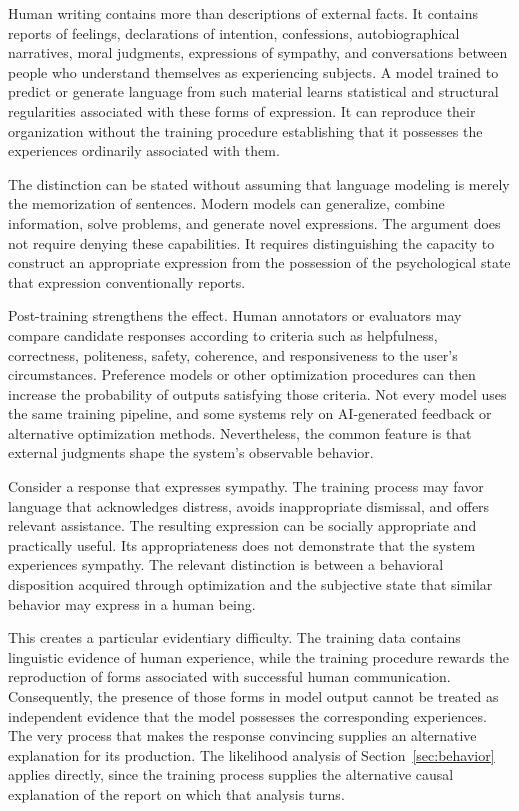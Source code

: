\documentclass[12pt]{article}
\theoremstyle{definition}
\begin{document}
Human writing contains more than descriptions of external facts. It contains reports of feelings, declarations of intention, confessions, autobiographical narratives, moral judgments, expressions of sympathy, and conversations between people who understand themselves as experiencing subjects. A model trained to predict or generate language from such material learns statistical and structural regularities associated with these forms of expression. It can reproduce their organization without the training procedure establishing that it possesses the experiences ordinarily associated with them.

The distinction can be stated without assuming that language modeling is merely the memorization of sentences. Modern models can generalize, combine information, solve problems, and generate novel expressions. The argument does not require denying these capabilities. It requires distinguishing the capacity to construct an appropriate expression from the possession of the psychological state that expression conventionally reports.

Post-training strengthens the effect. Human annotators or evaluators may compare candidate responses according to criteria such as helpfulness, correctness, politeness, safety, coherence, and responsiveness to the user's circumstances. Preference models or other optimization procedures can then increase the probability of outputs satisfying those criteria. Not every model uses the same training pipeline, and some systems rely on AI-generated feedback or alternative optimization methods. Nevertheless, the common feature is that external judgments shape the system's observable behavior.

Consider a response that expresses sympathy. The training process may favor language that acknowledges distress, avoids inappropriate dismissal, and offers relevant assistance. The resulting expression can be socially appropriate and practically useful. Its appropriateness does not demonstrate that the system experiences sympathy. The relevant distinction is between a behavioral disposition acquired through optimization and the subjective state that similar behavior may express in a human being.

This creates a particular evidentiary difficulty. The training data contains linguistic evidence of human experience, while the training procedure rewards the reproduction of forms associated with successful human communication. Consequently, the presence of those forms in model output cannot be treated as independent evidence that the model possesses the corresponding experiences. The very process that makes the response convincing supplies an alternative explanation for its production. The likelihood analysis of Section~\ref{sec:behavior} applies directly, since the training process supplies the alternative causal explanation of the report on which that analysis turns.
\end{document}
